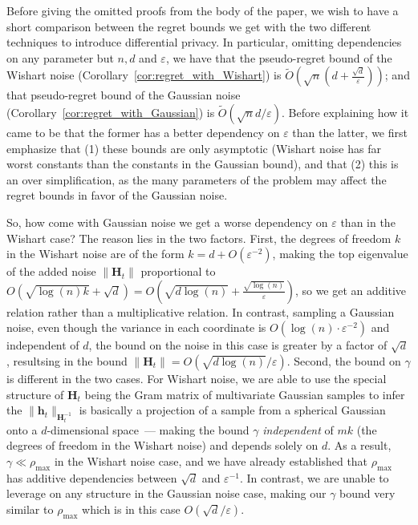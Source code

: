 \documentclass{article}
\renewcommand{\vec}[1]{\bm{#1}}
\newcommand{\inv}[1]{#1^{-1}}
\begin{document}
Before giving the omitted proofs from the body of the paper, we wish to have a short comparison between the regret bounds we get with the two different techniques to introduce differential privacy. In particular, omitting dependencies on any parameter but $n,d$ and $\varepsilon$, we have that the pseudo-regret bound of the Wishart noise (Corollary~\ref{cor:regret_with_Wishart}) is $\tilde O(\sqrt n(d+\tfrac{\sqrt d}\varepsilon))$; and that pseudo-regret bound of the Gaussian noise (Corollary~\ref{cor:regret_with_Gaussian}) is $\tilde O(\sqrt nd/\varepsilon)$. Before explaining how it came to be that the former has a better dependency on $\varepsilon$ than the latter, we first emphasize that (1) these bounds are only asymptotic (Wishart noise has far worst constants than the constants in the Gaussian bound), and that (2) this is an over simplification, as the many parameters of the problem may affect the regret bounds in favor of the Gaussian noise.

So, how come with Gaussian noise we get a worse dependency on $\varepsilon$ than in the Wishart case? The reason lies in the two factors. First, the degrees of freedom $k$ in the Wishart noise are of the form $k=d+O(\varepsilon^{-2})$, making the top eigenvalue of the added noise $\|\vec H_t\|$ proportional to $O(\sqrt{\log(n)k}+\sqrt d) = O(\sqrt{d\log(n)}+ \tfrac{\sqrt{\log(n)}}{\varepsilon})$, so we get an additive relation rather than a multiplicative relation. In contrast, sampling a Gaussian noise, even though the variance in each coordinate is $O(\log(n)\cdot \varepsilon^{-2})$ and independent of $d$, the bound on the noise in this case is greater by a factor of $\sqrt{d}$, resultsing in the bound $\|\vec H_t\| = O(\sqrt{d\log(n)}/\varepsilon)$. Second, the bound on $\gamma$ is different in the two cases. For Wishart noise, we are able to use the special structure of $\vec H_t$ being the Gram matrix of multivariate Gaussian samples to infer the $\|\vec h_t\|_{\inv{\vec H_t}}$ is basically a projection of a sample from a spherical Gaussian onto a $d$-dimensional space~--- making the bound $\gamma$ \emph{independent} of $mk$ (the degrees of freedom in the Wishart noise) and depends solely on $d$. As a result, $\gamma \ll \rho_{\max}$ in the Wishart noise case, and we have already established that $\rho_{\max}$ has additive dependencies between $\sqrt d$ and $\varepsilon^{-1}$. In contrast, we are unable to leverage on any structure in the Gaussian noise case, making our $\gamma$ bound very similar to $\rho_{\max}$ which is in this case $O(\sqrt d/\varepsilon)$.
\end{document}
